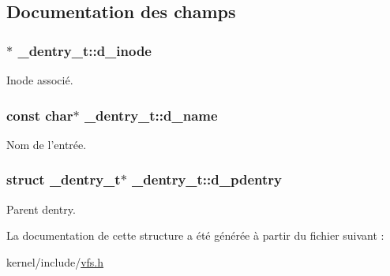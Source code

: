 \subsection{Documentation des champs}
\hypertarget{struct__dentry__t_ac711731a0c08b35b5d2731b8545c7454}{
\subsubsection[{d\+\_\+inode}]{$\ast$ \+\_\+dentry\+\_\+t\+::d\+\_\+inode}}\label{struct__dentry__t_ac711731a0c08b35b5d2731b8545c7454}
Inode associé. \hypertarget{struct__dentry__t_ac9b991f6f5d5c5ce60e8d256d667265e}{
\subsubsection[{d\+\_\+name}]{\setlength{\rightskip}{0pt plus 5cm}const char$\ast$ \+\_\+dentry\+\_\+t\+::d\+\_\+name}}\label{struct__dentry__t_ac9b991f6f5d5c5ce60e8d256d667265e}
Nom de l'entrée. \hypertarget{struct__dentry__t_a900178add855a65bb2c42a1fbb94686b}{
\subsubsection[{d\+\_\+pdentry}]{\setlength{\rightskip}{0pt plus 5cm}struct {\bf \+\_\+dentry\+\_\+t}$\ast$ \+\_\+dentry\+\_\+t\+::d\+\_\+pdentry}}\label{struct__dentry__t_a900178add855a65bb2c42a1fbb94686b}
Parent dentry. 

La documentation de cette structure a été générée à partir du fichier suivant \+:\begin{DoxyCompactItemize}
\item 
kernel/include/\hyperlink{vfs_8h}{vfs.\+h}\end{DoxyCompactItemize}

